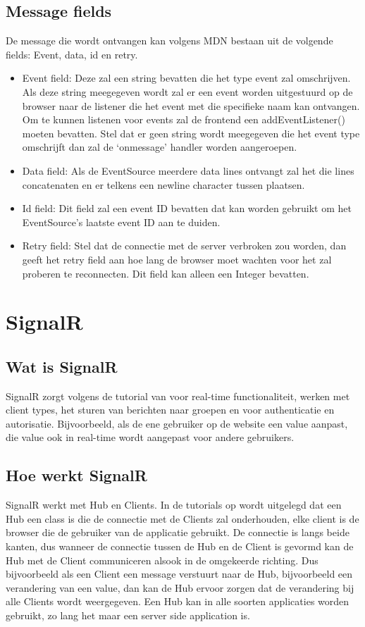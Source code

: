 \subsection{Message fields}
De message die wordt ontvangen kan volgens MDN \textcite{DevMozSSE} bestaan uit de volgende fields: Event, data, id en retry.
\begin{itemize}
    \item Event field: Deze zal een string bevatten die het type event zal omschrijven. Als deze string meegegeven wordt zal er een event worden uitgestuurd op de browser naar de listener die het event met die specifieke naam kan ontvangen. Om te kunnen listenen voor events zal de frontend een addEventListener() moeten bevatten. Stel dat er geen string wordt meegegeven die het event type omschrijft dan zal de ‘onmessage’ handler worden aangeroepen.
    \item Data field: Als de EventSource meerdere data lines ontvangt zal het die lines concatenaten en er telkens een newline character tussen plaatsen.
    \item Id field: Dit field zal een event ID bevatten dat kan worden gebruikt om het EventSource’s laatste event ID aan te duiden.
    \item Retry field: Stel dat de connectie met de server verbroken zou worden, dan geeft het retry field aan hoe lang de browser moet wachten voor het zal proberen te reconnecten. Dit field kan alleen een Integer bevatten.
\end{itemize}




\section{SignalR}
\subsection{Wat is SignalR}
SignalR zorgt volgens de tutorial van \textcite{PluralsightSignalR} voor real-time functionaliteit, werken met client types, het sturen van berichten naar groepen en voor authenticatie en autorisatie. Bijvoorbeeld, als de ene gebruiker op de website een value aanpast, die value ook in real-time wordt aangepast voor andere gebruikers. 

\subsection{Hoe werkt SignalR}
SignalR werkt met Hub en Clients. In de tutorials op \textcite{PluralsightSignalR} wordt uitgelegd dat een Hub een class is die de connectie met de Clients zal onderhouden, elke client is de browser die de gebruiker van de applicatie gebruikt. De connectie is langs beide kanten, dus wanneer de connectie tussen de Hub en de Client is gevormd kan de Hub met de Client communiceren alsook in de omgekeerde richting. Dus bijvoorbeeld als een Client een message verstuurt naar de Hub, bijvoorbeeld een verandering van een value, dan kan de Hub ervoor zorgen dat de verandering bij alle Clients wordt weergegeven. Een Hub kan in alle soorten applicaties worden gebruikt, zo lang het maar een server side application is. 

